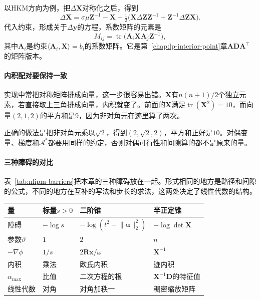 以HKM方向为例，把$\Delta\bm{X}$对称化之后，得到
\[
 \Delta\bm{X}=\sigma\mu\bm{Z}^{-1}-\bm{X}-\tfrac12\bigl(\bm{X}\Delta\bm{Z}\bm{Z}^{-1}+\bm{Z}^{-1}\Delta\bm{Z}\bm{X}\bigr).
\]
代入约束，形成关于$\Delta\bm{y}$的方程，系数矩阵的元素是
\begin{equation}
 M_{ij}=\operatorname{tr}\bigl(\bm{A}_i\bm{X}\bm{A}_j\bm{Z}^{-1}\bigr),
 \label{eq:nlipm-psd-schur}
\end{equation}
其中$\bm{A}_i$是约束$\langle\bm{A}_i,\bm{X}\rangle=b_i$的系数矩阵。它是第~\ref{chap:lp-interior-point}章$\bm{A}\bm{D}\bm{A}^\top$的矩阵版本。

\paragraph{内积配对要保持一致}
实现中常把对称矩阵排成向量，这一步很容易出错。$\bm{X}$有$n(n+1)/2$个独立元素，若直接取上三角排成向量，内积就变了。前面的$\bm{X}$满足$\operatorname{tr}(\bm{X}^2)=10$，而向量$(2,1,2)$的平方和是$9$，因为非对角元在迹里算了两次。

正确的做法是把非对角元乘以$\sqrt{2}$，得到$(2,\sqrt{2},2)$，平方和正好是$10$。对偶变量、梯度和$\mathcal{A}^*$都要用同样的约定，否则对偶可行性和间隙算的都不是原来的量。

\paragraph{三种障碍的对比}
表~\ref{tab:nlipm-barriers}把本章的三种障碍放在一起。形式相同的地方是路径和间隙的公式，不同的地方在互补的写法和步长的求法，这两处决定了线性代数的结构。

\begin{BookInlineTable}
  \centering
  \footnotesize
  \begin{tabular}{@{}llll@{}}
    \toprule
    量 & 标量$s>0$ & 二阶锥 & 半正定锥\\
    \midrule
    障碍 & $-\log s$ & $-\log(t^2-\lVert\bm{u}\rVert_2^2)$ & $-\log\det\bm{X}$\\
    参数$\vartheta$ & $1$ & $2$ & $n$\\
    $-\nabla\phi$ & $1/s$ & $2\bm{R}\bm{x}/\omega$ & $\bm{X}^{-1}$\\
    内积 & 乘法 & 欧氏内积 & 迹内积\\
    $\alpha_{\max}$ & 比值 & 二次方程的根 & $\bm{X}^{-1}\bm{D}$的特征值\\
    线性代数 & 对角 & 对角加秩一 & 稠密缩放矩阵\\
    \bottomrule
  \end{tabular}
  \caption{三种锥的障碍及相应的计算。}
  \label{tab:nlipm-barriers}
\end{BookInlineTable}
